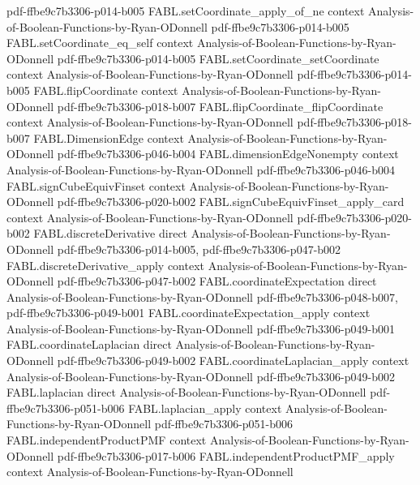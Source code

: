 \begin{theorem}
  {pdf-ffbe9c7b3306-p014-b005}
\proofstep
  {FABL.setCoordinate_apply_of_ne}
  {context}
  {Analysis-of-Boolean-Functions-by-Ryan-ODonnell}
  {pdf-ffbe9c7b3306-p014-b005}
\proofstep
  {FABL.setCoordinate_eq_self}
  {context}
  {Analysis-of-Boolean-Functions-by-Ryan-ODonnell}
  {pdf-ffbe9c7b3306-p014-b005}
\proofstep
  {FABL.setCoordinate_setCoordinate}
  {context}
  {Analysis-of-Boolean-Functions-by-Ryan-ODonnell}
  {pdf-ffbe9c7b3306-p014-b005}
\proofstep
  {FABL.flipCoordinate}
  {context}
  {Analysis-of-Boolean-Functions-by-Ryan-ODonnell}
  {pdf-ffbe9c7b3306-p018-b007}
\proofstep
  {FABL.flipCoordinate_flipCoordinate}
  {context}
  {Analysis-of-Boolean-Functions-by-Ryan-ODonnell}
  {pdf-ffbe9c7b3306-p018-b007}
\proofstep
  {FABL.DimensionEdge}
  {context}
  {Analysis-of-Boolean-Functions-by-Ryan-ODonnell}
  {pdf-ffbe9c7b3306-p046-b004}
\proofstep
  {FABL.dimensionEdgeNonempty}
  {context}
  {Analysis-of-Boolean-Functions-by-Ryan-ODonnell}
  {pdf-ffbe9c7b3306-p046-b004}
\proofstep
  {FABL.signCubeEquivFinset}
  {context}
  {Analysis-of-Boolean-Functions-by-Ryan-ODonnell}
  {pdf-ffbe9c7b3306-p020-b002}
\proofstep
  {FABL.signCubeEquivFinset_apply_card}
  {context}
  {Analysis-of-Boolean-Functions-by-Ryan-ODonnell}
  {pdf-ffbe9c7b3306-p020-b002}
\proofstep
  {FABL.discreteDerivative}
  {direct}
  {Analysis-of-Boolean-Functions-by-Ryan-ODonnell}
  {pdf-ffbe9c7b3306-p014-b005,
    pdf-ffbe9c7b3306-p047-b002}
\proofstep
  {FABL.discreteDerivative_apply}
  {context}
  {Analysis-of-Boolean-Functions-by-Ryan-ODonnell}
  {pdf-ffbe9c7b3306-p047-b002}
\proofstep
  {FABL.coordinateExpectation}
  {direct}
  {Analysis-of-Boolean-Functions-by-Ryan-ODonnell}
  {pdf-ffbe9c7b3306-p048-b007,
    pdf-ffbe9c7b3306-p049-b001}
\proofstep
  {FABL.coordinateExpectation_apply}
  {context}
  {Analysis-of-Boolean-Functions-by-Ryan-ODonnell}
  {pdf-ffbe9c7b3306-p049-b001}
\proofstep
  {FABL.coordinateLaplacian}
  {direct}
  {Analysis-of-Boolean-Functions-by-Ryan-ODonnell}
  {pdf-ffbe9c7b3306-p049-b002}
\proofstep
  {FABL.coordinateLaplacian_apply}
  {context}
  {Analysis-of-Boolean-Functions-by-Ryan-ODonnell}
  {pdf-ffbe9c7b3306-p049-b002}
\proofstep
  {FABL.laplacian}
  {direct}
  {Analysis-of-Boolean-Functions-by-Ryan-ODonnell}
  {pdf-ffbe9c7b3306-p051-b006}
\proofstep
  {FABL.laplacian_apply}
  {context}
  {Analysis-of-Boolean-Functions-by-Ryan-ODonnell}
  {pdf-ffbe9c7b3306-p051-b006}
\proofstep
  {FABL.independentProductPMF}
  {context}
  {Analysis-of-Boolean-Functions-by-Ryan-ODonnell}
  {pdf-ffbe9c7b3306-p017-b006}
\proofstep
  {FABL.independentProductPMF_apply}
  {context}
  {Analysis-of-Boolean-Functions-by-Ryan-ODonnell}

\end{theorem}
